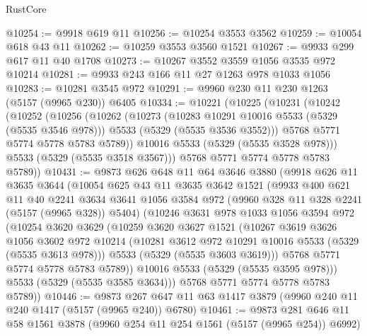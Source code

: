 \begin{lexlean}{RustCore}
\begin{coremodule}
@10254 := @9918 @619 @11
@10256 := @10254 @3553 @3562
@10259 := @10054 @618 @43 @11
@10262 := @10259 @3553 @3560 @1521
@10267 := @9933 @299 @617 @11 @40 @1708
@10273 := @10267 @3552 @3559 @1056 @3535 @972 @10214
@10281 := @9933 @243 @166 @11 @27 @1263 @978 @1033 @1056
@10283 := @10281 @3545 @972
@10291 := @9960 @230 @11 @230 @1263 (@5157 (@9965 @230)) @6405
@10334 := @10221
    (@10225
      (@10231
        (@10242
          (@10252
            (@10256
              (@10262
                (@10273
                  (@10283 @10291 @10016 @5533 (@5329 (@5535 @3546 @978)))
                  @5533
                  (@5329 (@5535 @3536 @3552)))
                @5768
                @5771
                @5774
                @5778
                @5783
                @5789))
            @10016
            @5533
            (@5329 (@5535 @3528 @978)))
          @5533
          (@5329 (@5535 @3518 @3567)))
        @5768
        @5771
        @5774
        @5778
        @5783
        @5789))
@10431 := @9873
    @626
    @648
    @11
    @64
    @3646
    @3880
    (@9918
      @626
      @11
      @3635
      @3644
      (@10054
        @625
        @43
        @11
        @3635
        @3642
        @1521
        (@9933
          @400
          @621
          @11
          @40
          @2241
          @3634
          @3641
          @1056
          @3584
          @972
          (@9960 @328 @11 @328 @2241 (@5157 (@9965 @328)) @5404)
          (@10246
            @3631
            @978
            @1033
            @1056
            @3594
            @972
            (@10254
              @3620
              @3629
              (@10259
                @3620
                @3627
                @1521
                (@10267
                  @3619
                  @3626
                  @1056
                  @3602
                  @972
                  @10214
                  (@10281 @3612 @972 @10291 @10016 @5533 (@5329 (@5535 @3613 @978)))
                  @5533
                  (@5329 (@5535 @3603 @3619)))
                @5768
                @5771
                @5774
                @5778
                @5783
                @5789))
            @10016
            @5533
            (@5329 (@5535 @3595 @978)))
          @5533
          (@5329 (@5535 @3585 @3634)))
        @5768
        @5771
        @5774
        @5778
        @5783
        @5789))
@10446 := @9873 @267 @647 @11 @63 @1417 @3879 (@9960 @240 @11 @240 @1417 (@5157 (@9965 @240)) @6780)
@10461 := @9873 @281 @646 @11 @58 @1561 @3878 (@9960 @254 @11 @254 @1561 (@5157 (@9965 @254)) @6992)

\end{coremodule}
\end{lexlean}
